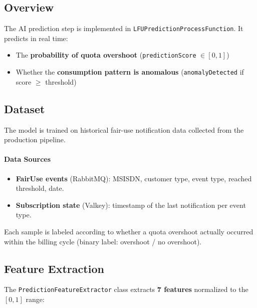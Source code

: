 \subsection{Overview}

The AI prediction step is implemented in \texttt{LFUPredictionProcessFunction}. It predicts in real time:
\begin{itemize}
    \item The \textbf{probability of quota overshoot} (\texttt{predictionScore} $\in [0, 1]$)
    \item Whether the \textbf{consumption pattern is anomalous} (\texttt{anomalyDetected} if score $\geq$ threshold)
\end{itemize}

\subsection{Dataset}

The model is trained on historical fair-use notification data collected from the production pipeline.

\paragraph{Data Sources}
\begin{itemize}
    \item \textbf{FairUse events} (RabbitMQ): MSISDN, customer type, event type, reached threshold, date.
    \item \textbf{Subscription state} (Valkey): timestamp of the last notification per event type.
\end{itemize}

Each sample is labeled according to whether a quota overshoot actually occurred within the billing cycle (binary label: overshoot / no overshoot).

\subsection{Feature Extraction}

The \texttt{PredictionFeatureExtractor} class extracts \textbf{7 features} normalized to the $[0, 1]$ range:


